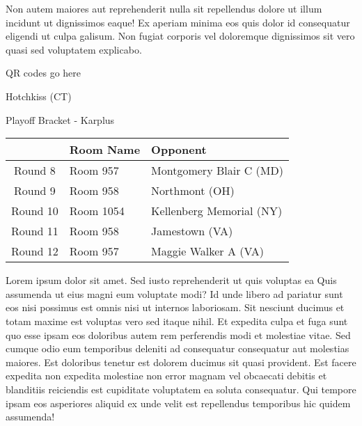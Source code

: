 \documentclass{article}%
\begin{document}
\newline%
Non autem maiores aut reprehenderit nulla sit repellendus dolore ut illum incidunt ut dignissimos eaque! Ex aperiam minima eos quis dolor id consequatur eligendi ut culpa galisum. Non fugiat corporis vel doloremque dignissimos sit vero quasi sed voluptatem explicabo.\newline%
\newline%
%
\vspace*{30pt}%
\begin{center}%
\begin{Huge}%
QR codes go here%
\end{Huge}%
\end{center}%
\newpage%
\begin{center}%
\begin{Huge}%
Hotchkiss (CT)%
\end{Huge}%
\vspace*{8pt}%
\linebreak%
\begin{Large}%
Playoff Bracket {-} Karplus%
\end{Large}%
\end{center}%
\begin{tabularx}{\textwidth}{|c|Y|Y|}%
\hline%
&Room Name&Opponent\\%
\hline%
Round 8&Room 957&Montgomery Blair C (MD)\\%
Round 9&Room 958&Northmont (OH)\\%
Round 10&Room 1054&Kellenberg Memorial (NY)\\%
Round 11&Room 958&Jamestown (VA)\\%
Round 12&Room 957&Maggie Walker A (VA)\\%
\hline%
\end{tabularx}%
\vspace*{8pt}%
\linebreak%
\newline%
\newline%
Lorem ipsum dolor sit amet. Sed iusto reprehenderit ut quis voluptas ea Quis assumenda ut eius magni eum voluptate modi? Id unde libero ad pariatur sunt eos nisi possimus est omnis nisi ut internos laboriosam. Sit nesciunt ducimus et totam maxime est voluptas vero sed itaque nihil. Et expedita culpa et fuga sunt quo esse ipsam eos doloribus autem rem perferendis modi et molestiae vitae.\newline%
\newline%
Sed cumque odio eum temporibus deleniti ad consequatur consequatur aut molestias maiores. Est doloribus tenetur est dolorem ducimus sit quasi provident. Est facere expedita non expedita molestiae non error magnam vel obcaecati debitis et blanditiis reiciendis est cupiditate voluptatem ea soluta consequatur. Qui tempore ipsam eos asperiores aliquid ex unde velit est repellendus temporibus hic quidem assumenda!\newline%
\end{document}
